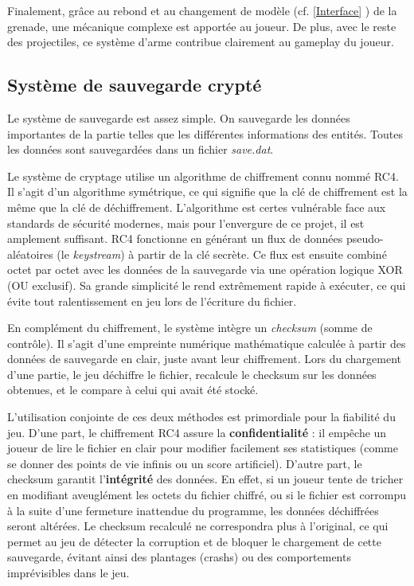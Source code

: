 \documentclass[a4paper,11pt]{article}
\newcommand{\secref}[1]{\autoref{#1} \og \nameref{#1} \fg{}}
\begin{document}
Finalement, grâce au rebond et au changement de modèle (cf. \secref{Interface}) de la grenade, une mécanique \og complexe \fg{} est apportée au joueur. De plus, avec le reste des projectiles, ce système d'arme contribue clairement au gameplay du joueur.


\subsection{Système de sauvegarde crypté}
\hspace*{1.5em}
Le système de sauvegarde est assez simple. On sauvegarde les données importantes de la partie telles que les différentes informations des entités. Toutes les 
données sont sauvegardées dans un fichier \emph{save.dat}. 

Le système de cryptage utilise un algorithme de chiffrement connu nommé RC4. Il s'agit d'un algorithme symétrique, ce qui signifie que la clé de chiffrement est 
la même que la clé de déchiffrement. L'algorithme est certes vulnérable face aux standards de sécurité modernes, mais pour l'envergure de ce projet, il est 
amplement suffisant. RC4 fonctionne en générant un flux de données pseudo-aléatoires (le \emph{keystream}) à partir de la clé secrète. Ce flux est ensuite 
combiné octet par octet avec les données de la sauvegarde via une opération logique XOR (OU exclusif). Sa grande simplicité le rend extrêmement rapide à exécuter, 
ce qui évite tout ralentissement en jeu lors de l'écriture du fichier.

En complément du chiffrement, le système intègre un \emph{checksum} (somme de contrôle). Il s'agit d'une empreinte numérique mathématique calculée à partir des 
données de sauvegarde en clair, juste avant leur chiffrement. Lors du chargement d'une partie, le jeu déchiffre le fichier, recalcule le checksum sur les données 
obtenues, et le compare à celui qui avait été stocké.

L'utilisation conjointe de ces deux méthodes est primordiale pour la fiabilité du jeu. D'une part, le chiffrement RC4 assure la \textbf{confidentialité} : il 
empêche un joueur de lire le fichier en clair pour modifier facilement ses statistiques (comme se donner des points de vie infinis ou un score artificiel). 
D'autre part, le checksum garantit l'\textbf{intégrité} des données. En effet, si un joueur tente de tricher en modifiant aveuglément les octets du fichier 
chiffré, ou si le fichier est corrompu à la suite d'une fermeture inattendue du programme, les données déchiffrées seront altérées. Le checksum recalculé ne 
correspondra plus à l'original, ce qui permet au jeu de détecter la corruption et de bloquer le chargement de cette sauvegarde, évitant ainsi des plantages 
(crashs) ou des comportements imprévisibles dans le jeu.
\end{document}
